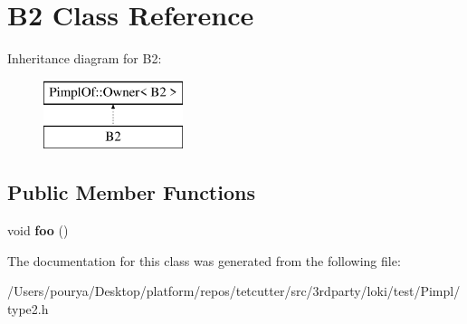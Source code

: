 \hypertarget{classB2}{}\section{B2 Class Reference}
\label{classB2}
Inheritance diagram for B2\+:\begin{figure}[H]
\begin{center}
\leavevmode
\includegraphics[height=2.000000cm]{classB2}
\end{center}
\end{figure}
\subsection*{Public Member Functions}
\begin{DoxyCompactItemize}
\item 
\hypertarget{classB2_a42d2830f554847b4dedb611414ee0b63}{}void {\bfseries foo} ()\label{classB2_a42d2830f554847b4dedb611414ee0b63}

\end{DoxyCompactItemize}


The documentation for this class was generated from the following file\+:\begin{DoxyCompactItemize}
\item 
/\+Users/pourya/\+Desktop/platform/repos/tetcutter/src/3rdparty/loki/test/\+Pimpl/type2.\+h\end{DoxyCompactItemize}

